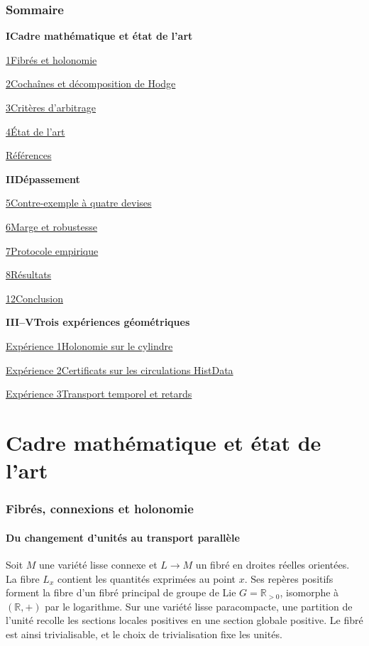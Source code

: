 \documentclass[11pt,a4paper]{article}
\theoremstyle{clair}
\newcommand{\R}{\mathbb{R}}
\newcommand{\navline}[2]{\hyperref[#2]{#1}\hfill\pageref{#2}\par}
\begin{document}
\section*{Sommaire}
\begin{minipage}[t]{0.46\textwidth}
\small
\textbf{I\quad Cadre mathématique et état de l'art}\par
\navline{1\quad Fibrés et holonomie}{sec:geometrie}
\navline{2\quad Cochaînes et décomposition de Hodge}{sec:discret}
\navline{3\quad Critères d'arbitrage}{sec:criteres}
\navline{4\quad État de l'art}{sec:etatart}
\navline{Références}{sec:references}
\end{minipage}\hfill
\begin{minipage}[t]{0.48\textwidth}
\small
\textbf{II\quad Dépassement}\par
\navline{5\quad Contre-exemple à quatre devises}{sec:contrex}
\navline{6\quad Marge et robustesse}{sec:marge}
\navline{7\quad Protocole empirique}{sec:protocole}
\navline{8\quad Résultats}{sec:resultats}
\navline{12\quad Conclusion}{sec:conclusion}
\end{minipage}
\vspace{4mm}
{\small
\textbf{III--V\quad Trois expériences géométriques}\par
\navline{Expérience 1\quad Holonomie sur le cylindre}{sec:experience-un}
\navline{Expérience 2\quad Certificats sur les circulations HistData}{sec:experience-deux}
\navline{Expérience 3\quad Transport temporel et retards}{sec:experience-trois}
}
\clearpage

\part{Cadre mathématique et état de l'art}
\label{part:etat}
\section{Fibrés, connexions et holonomie}
\label{sec:geometrie}
\subsection{Du changement d'unités au transport parallèle}

Soit \(M\) une variété lisse connexe et \(L\to M\) un fibré en droites réelles orientées. La fibre \(L_x\) contient les quantités exprimées au point \(x\). Ses repères positifs forment la fibre d'un fibré principal de groupe de Lie \(G=\R_{>0}\), isomorphe à \((\R,+)\) par le logarithme. Sur une variété lisse paracompacte, une partition de l'unité recolle les sections locales positives en une section globale positive. Le fibré est ainsi trivialisable, et le choix de trivialisation fixe les unités.
\end{document}
